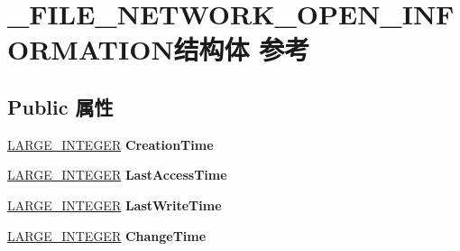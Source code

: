 \hypertarget{struct___f_i_l_e___n_e_t_w_o_r_k___o_p_e_n___i_n_f_o_r_m_a_t_i_o_n}{}\section{\+\_\+\+F\+I\+L\+E\+\_\+\+N\+E\+T\+W\+O\+R\+K\+\_\+\+O\+P\+E\+N\+\_\+\+I\+N\+F\+O\+R\+M\+A\+T\+I\+O\+N结构体 参考}
\label{struct___f_i_l_e___n_e_t_w_o_r_k___o_p_e_n___i_n_f_o_r_m_a_t_i_o_n}
\subsection*{Public 属性}
\begin{DoxyCompactItemize}
\item 
\mbox{\label{struct___f_i_l_e___n_e_t_w_o_r_k___o_p_e_n___i_n_f_o_r_m_a_t_i_o_n_a0c43dfa3180a99d38a362ef5da3e1f6c}} 
\hyperlink{union___l_a_r_g_e___i_n_t_e_g_e_r}{L\+A\+R\+G\+E\+\_\+\+I\+N\+T\+E\+G\+ER} {\bfseries Creation\+Time}
\item 
\mbox{\label{struct___f_i_l_e___n_e_t_w_o_r_k___o_p_e_n___i_n_f_o_r_m_a_t_i_o_n_a9aa071fe1d3074e7544b6f938012a7d0}} 
\hyperlink{union___l_a_r_g_e___i_n_t_e_g_e_r}{L\+A\+R\+G\+E\+\_\+\+I\+N\+T\+E\+G\+ER} {\bfseries Last\+Access\+Time}
\item 
\mbox{\label{struct___f_i_l_e___n_e_t_w_o_r_k___o_p_e_n___i_n_f_o_r_m_a_t_i_o_n_ab50993c21c768a2795e3e796fd63c91f}} 
\hyperlink{union___l_a_r_g_e___i_n_t_e_g_e_r}{L\+A\+R\+G\+E\+\_\+\+I\+N\+T\+E\+G\+ER} {\bfseries Last\+Write\+Time}
\item 
\mbox{\label{struct___f_i_l_e___n_e_t_w_o_r_k___o_p_e_n___i_n_f_o_r_m_a_t_i_o_n_ab6d582dcc02c01dd5d8d8eeccda63023}} 
\hyperlink{union___l_a_r_g_e___i_n_t_e_g_e_r}{L\+A\+R\+G\+E\+\_\+\+I\+N\+T\+E\+G\+ER} {\bfseries Change\+Time}
\item 
\mbox{\label{struct___f_i_l_e___n_e_t_w_o_r_k___o_p_e_n___i_n_f_o_r_m_a_t_i_o_n_a09330849bec043939660270401f5d4b9}} 

\end{DoxyCompactItemize}
